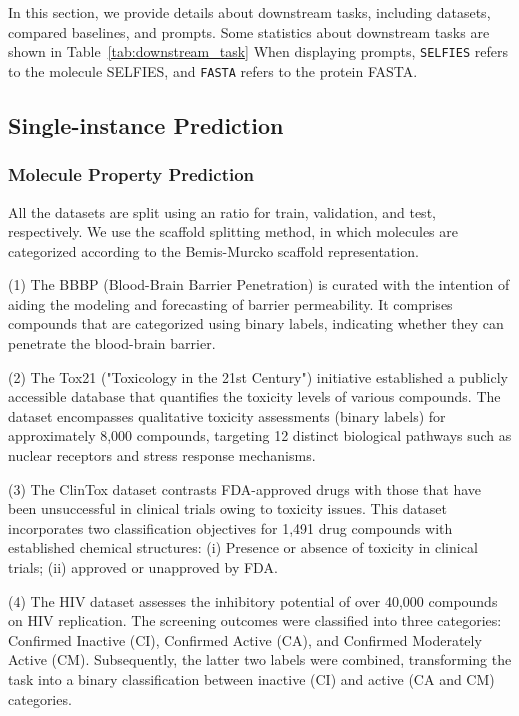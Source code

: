 \documentclass[11pt]{article}
\newcommand{\selfies}{\texttt{SELFIES}}
\newcommand{\fasta}{\texttt{FASTA}}
\begin{document}
In this section, we provide details about downstream tasks, including datasets, compared baselines, and prompts.
Some statistics about downstream tasks are shown in Table~\ref{tab:downstream_task}
When displaying prompts, \selfies{} refers to the molecule SELFIES, and \fasta{} refers to the protein FASTA. 

\subsection{Single-instance Prediction}
\subsubsection{Molecule Property Prediction}
All the datasets are split using an  ratio for train, validation, and test, respectively.
We use the scaffold splitting method, in which molecules are categorized according to the Bemis-Murcko scaffold representation.


\noindent(1) The BBBP (Blood-Brain Barrier Penetration) is curated with the intention of aiding the modeling and forecasting of barrier permeability. It comprises compounds that are categorized using binary labels, indicating whether they can penetrate the blood-brain barrier.

\noindent(2) The Tox21 ("Toxicology in the 21st Century") initiative established a publicly accessible database that quantifies the toxicity levels of various compounds. The dataset encompasses qualitative toxicity assessments (binary labels) for approximately 8,000 compounds, targeting 12 distinct biological pathways such as nuclear receptors and stress response mechanisms.

\noindent(3) The ClinTox dataset contrasts FDA-approved drugs with those that have been unsuccessful in clinical trials owing to toxicity issues. This dataset incorporates two classification objectives for 1,491 drug compounds with established chemical structures:
(i) Presence or absence of toxicity in clinical trials; (ii) approved or unapproved by FDA.

\noindent(4) The HIV dataset assesses the inhibitory potential of over 40,000 compounds on HIV replication. The screening outcomes were classified into three categories: Confirmed Inactive (CI), Confirmed Active (CA), and Confirmed Moderately Active (CM). Subsequently, the latter two labels were combined, transforming the task into a binary classification between inactive (CI) and active (CA and CM) categories.
\end{document}
